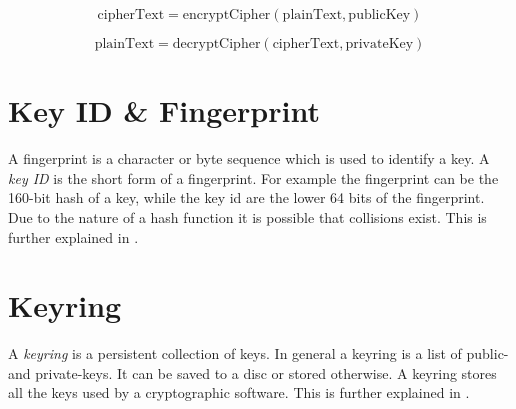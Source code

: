 \begin{equation} \label{eq:pkencrypt}
	\text{cipherText} = \text{encryptCipher}(\text{plainText}, \text{publicKey})
\end{equation}

\begin{equation} \label{eq:pkdecrypt}
	\text{plainText} = \text{decryptCipher}(\text{cipherText}, \text{privateKey})
\end{equation}





\section{Key ID \&{} Fingerprint}
\label{section:pre:keyid}

A fingerprint is a character or byte sequence which is used to identify a key.
A \textit{key ID} is the short form of a fingerprint.
For example the fingerprint can be the 160-bit  hash of a key, while the key id are the lower 64 bits of the fingerprint. Due to the nature of a hash function it is possible that collisions exist.
This is further explained in \cite[section 12.2]{RFC4880}.


\section{Keyring}
\label{section:pre:keyring}

A \textit{keyring} is a persistent collection of keys. 
In general a keyring is a list of public- and private-keys. It can be saved to a disc or stored otherwise. 
A keyring stores all the keys used by a cryptographic software.
This is further explained in \cite[section 3.6]{RFC4880}.

